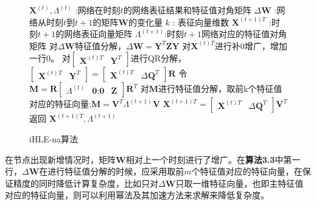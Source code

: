 \begin{figure}[htb]
	\centering
	\begin{minipage}{.7\linewidth}
		\begin{algorithm}[H]\label{iHLE_na}
			\small
			\caption{iHLE-na算法}
			\begin{algorithmic}[1]
				\Require
				\Statex $\textbf{X} ^{(t)},\Lambda^{(t)}$ :网络在时刻$t$的网络表征结果和特征值对角矩阵
				\Statex $\Delta\textbf{W}$ :网络从时刻$t$到$t+1$的矩阵$\textbf{W}$的变化量
				\Statex $k$ : 表征向量维数
				\Ensure
				\Statex $\textbf{X}^{(t+1)T}$ :时刻$t+1$的网络表征向量矩阵
				\Statex $\Lambda^{(t+1)}$:时刻$t+1$网络对应的特征值对角矩阵
				\Statex
				\State 对$\Delta\textbf{W}$特征值分解，$\Delta\textbf{W} =  \textbf{Y}^{T} \textbf{Z}  \textbf{Y}$
				\State 对$ \textbf{X}^{(t)T}$进行补0增广，增加一行0。
				\State 对$\begin{bmatrix} \textbf{X}^{(t)T} & \textbf{Y}^{T}\end{bmatrix}$进行QR分解，$\begin{bmatrix} \textbf{X}^{(t)T} & \textbf{Y}^{T}\end{bmatrix} = \begin{bmatrix} \textbf{X}^{(t)T} & \Delta\textbf{Q}^{T} \end{bmatrix} \textbf{R}$
				\State 令$\textbf{M} = \textbf{R}\begin{bmatrix}  \Lambda^{(t)} & \textbf{0};
				\textbf{0} & \textbf{Z} \end{bmatrix}
				\textbf{R}^T$
				\State 对$\textbf{M}$进行特征值分解，取前k个特征值对应的特征向量;$\textbf{M} =\textbf{V}^T \Lambda^{(t+1)} \textbf{V}$
				\State $\textbf{X}^{(t+1)T} = \begin{bmatrix} \textbf{X}^{(t)T} & \Delta\textbf{Q}^{T} \end{bmatrix} \textbf{V}^T$
				\State 返回 $\textbf{X}^{(t+1)T}, \Lambda^{(t+1)}$
			\end{algorithmic}
		\end{algorithm}
	\end{minipage}
\end{figure}
在节点出现新增情况时，矩阵\textbf{W}相对上一个时刻进行了增广。在\textbf{算法3.3}中第一行，$\Delta\textbf{W}$在进行特征值分解的时候，应采用取前$m$个特征值对应的特征向量，在保证精度的同时降低计算复杂度，比如只对$\Delta\textbf{W}$只取一维特征向量，也即主特征值对应的特征向量，则可以利用幂法及其加速方法来求解来降低复杂度。 
